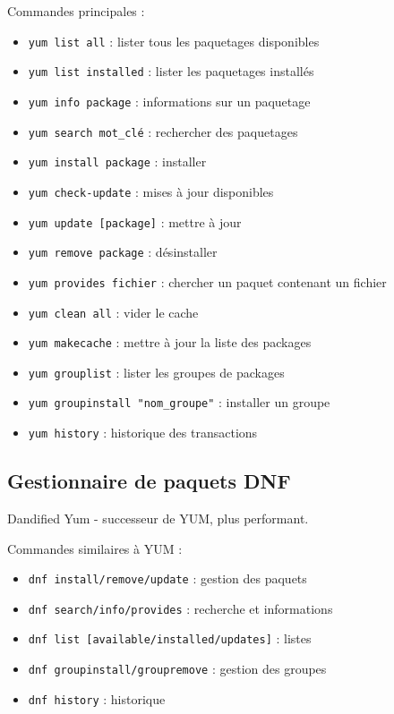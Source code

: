 \documentclass[12pt,a4paper]{article}
\begin{document}
Commandes principales :
\begin{itemize}
    \item \texttt{yum list all} : lister tous les paquetages disponibles
    \item \texttt{yum list installed} : lister les paquetages install\'es
    \item \texttt{yum info package} : informations sur un paquetage
    \item \texttt{yum search mot\_cl\'e} : rechercher des paquetages
    \item \texttt{yum install package} : installer
    \item \texttt{yum check-update} : mises \`a jour disponibles
    \item \texttt{yum update [package]} : mettre \`a jour
    \item \texttt{yum remove package} : d\'esinstaller
    \item \texttt{yum provides fichier} : chercher un paquet contenant un fichier
    \item \texttt{yum clean all} : vider le cache
    \item \texttt{yum makecache} : mettre \`a jour la liste des packages
    \item \texttt{yum grouplist} : lister les groupes de packages
    \item \texttt{yum groupinstall "nom\_groupe"} : installer un groupe
    \item \texttt{yum history} : historique des transactions
\end{itemize}


\subsection{Gestionnaire de paquets DNF}
Dandified Yum - successeur de YUM, plus performant.

Commandes similaires \`a YUM :
\begin{itemize}
    \item \texttt{dnf install/remove/update} : gestion des paquets
    \item \texttt{dnf search/info/provides} : recherche et informations
    \item \texttt{dnf list [available/installed/updates]} : listes
    \item \texttt{dnf groupinstall/groupremove} : gestion des groupes
    \item \texttt{dnf history} : historique
\end{itemize}
\end{document}
